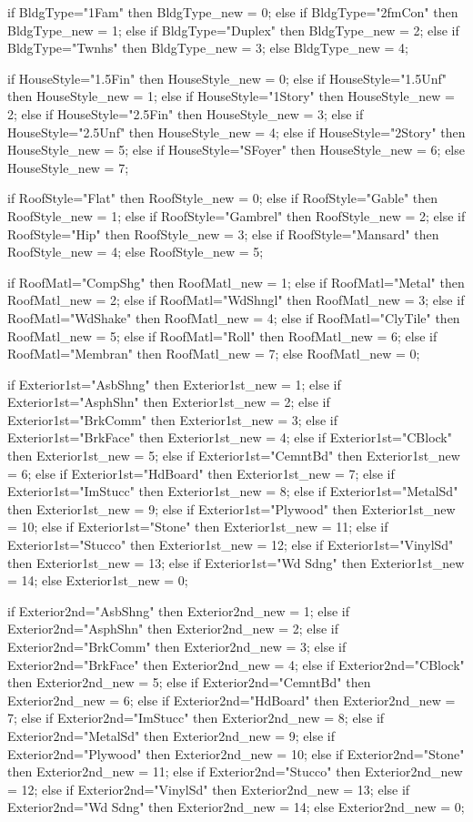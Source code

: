 		if BldgType="1Fam" 			then BldgType_new = 0;
		else if BldgType="2fmCon" 	then BldgType_new = 1;
		else if BldgType="Duplex" 	then BldgType_new = 2;
		else if BldgType="Twnhs" 	then BldgType_new = 3;
		else  BldgType_new = 4;

		if HouseStyle="1.5Fin" 		then HouseStyle_new = 0;
		else if HouseStyle="1.5Unf" then HouseStyle_new = 1;
		else if HouseStyle="1Story" then HouseStyle_new = 2;
		else if HouseStyle="2.5Fin" then HouseStyle_new = 3;
		else if HouseStyle="2.5Unf" then HouseStyle_new = 4;
		else if HouseStyle="2Story" then HouseStyle_new = 5;
		else if HouseStyle="SFoyer" then HouseStyle_new = 6;
		else  HouseStyle_new = 7;

		if RoofStyle="Flat" 		then RoofStyle_new = 0;
		else if RoofStyle="Gable" 	then RoofStyle_new = 1;
		else if RoofStyle="Gambrel" then RoofStyle_new = 2;
		else if RoofStyle="Hip" 	then RoofStyle_new = 3;
		else if RoofStyle="Mansard" then RoofStyle_new = 4;
		else RoofStyle_new = 5;

		if RoofMatl="CompShg" 		then RoofMatl_new = 1;
		else if RoofMatl="Metal" 	then RoofMatl_new = 2;
		else if RoofMatl="WdShngl" 	then RoofMatl_new = 3;
		else if RoofMatl="WdShake" 	then RoofMatl_new = 4;
		else if RoofMatl="ClyTile" 	then RoofMatl_new = 5;
		else if RoofMatl="Roll" 	then RoofMatl_new = 6;
		else if RoofMatl="Membran" 	then RoofMatl_new = 7;
		else  RoofMatl_new = 0;

		if Exterior1st="AsbShng" 		then Exterior1st_new = 1;
		else if Exterior1st="AsphShn" 	then Exterior1st_new = 2;
		else if Exterior1st="BrkComm" 	then Exterior1st_new = 3;
		else if Exterior1st="BrkFace" 	then Exterior1st_new = 4;
		else if Exterior1st="CBlock" 	then Exterior1st_new = 5;
		else if Exterior1st="CemntBd" 	then Exterior1st_new = 6;
		else if Exterior1st="HdBoard" 	then Exterior1st_new = 7;
		else if Exterior1st="ImStucc" 	then Exterior1st_new = 8;
		else if Exterior1st="MetalSd" 	then Exterior1st_new = 9;
		else if Exterior1st="Plywood" 	then Exterior1st_new = 10;
		else if Exterior1st="Stone" 	then Exterior1st_new = 11;
		else if Exterior1st="Stucco" 	then Exterior1st_new = 12;
		else if Exterior1st="VinylSd" 	then Exterior1st_new = 13;
		else if Exterior1st="Wd Sdng" 	then Exterior1st_new = 14;
		else Exterior1st_new = 0;

		if Exterior2nd="AsbShng" 		then Exterior2nd_new = 1;
		else if Exterior2nd="AsphShn" 	then Exterior2nd_new = 2;
		else if Exterior2nd="BrkComm" 	then Exterior2nd_new = 3;
		else if Exterior2nd="BrkFace" 	then Exterior2nd_new = 4;
		else if Exterior2nd="CBlock" 	then Exterior2nd_new = 5;
		else if Exterior2nd="CemntBd" 	then Exterior2nd_new = 6;
		else if Exterior2nd="HdBoard" 	then Exterior2nd_new = 7;
		else if Exterior2nd="ImStucc" 	then Exterior2nd_new = 8;
		else if Exterior2nd="MetalSd" 	then Exterior2nd_new = 9;
		else if Exterior2nd="Plywood" 	then Exterior2nd_new = 10;
		else if Exterior2nd="Stone" 	then Exterior2nd_new = 11;
		else if Exterior2nd="Stucco" 	then Exterior2nd_new = 12;
		else if Exterior2nd="VinylSd" 	then Exterior2nd_new = 13;
		else if Exterior2nd="Wd Sdng" 	then Exterior2nd_new = 14;
		else Exterior2nd_new = 0;

